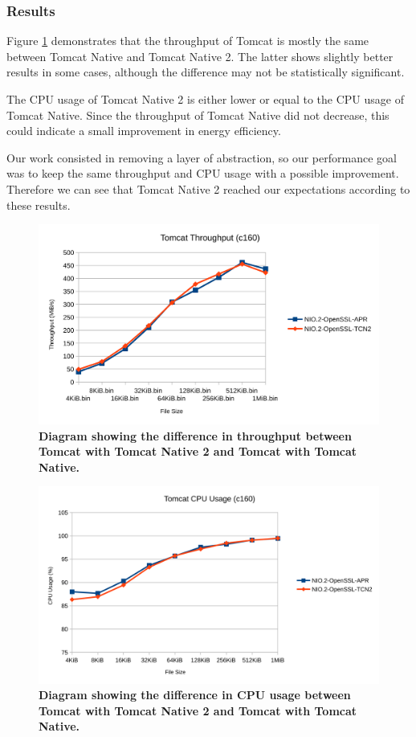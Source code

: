 \documentclass[11pt,a4paper,bibliography=totocnumbered]{scrartcl}
\def\mytitle{Tomcat Native 2}
\begin{document}
\subsubsection{Results}
Figure \ref{fig:tomcat-throughput} demonstrates that the throughput of Tomcat is mostly the same between Tomcat Native and \mytitle{}. The latter shows slightly better results in some cases, although the difference may not be statistically significant.

The CPU usage of \mytitle{} is either lower or equal to the CPU usage of Tomcat Native. Since the throughput of Tomcat Native did not decrease, this could indicate a small improvement in energy efficiency.

Our work consisted in removing a layer of abstraction, so our performance goal was to keep the same throughput and CPU usage with a possible improvement. Therefore we can see that \mytitle{} reached our expectations according to these results.
\begin{figure}[!h]
	\begin{center}
		\includegraphics[scale=0.23]{tomcat-throughput.pdf}
	\end{center}
	\caption{\textbf{Diagram showing the difference in throughput between Tomcat with \mytitle{} and Tomcat with Tomcat Native.}}
	\label{fig:tomcat-throughput}
\end{figure}

\begin{figure}[!h]
	\begin{center}
		\includegraphics[scale=0.22]{tomcat-cpu.pdf}
	\end{center}
	\caption{\textbf{Diagram showing the difference in CPU usage between Tomcat with \mytitle{} and Tomcat with Tomcat Native.}}
	\label{fig:tomcat-cpu}
\end{figure}
\end{document}
